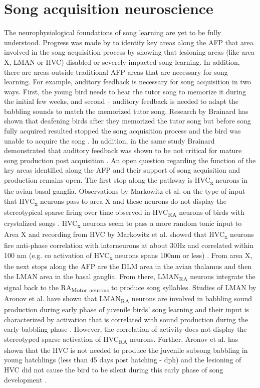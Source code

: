 \documentclass[draft,12pt,oneside]{CUNY_PhD}
\begin{document}
\section{Song acquisition neuroscience}
The neurophysiological foundations of song learning are yet to be fully understood. Progress was made by \cite{12} to identify key areas along the AFP that area involved in the song acquisition process by showing that lesioning areas (like area X, LMAN or HVC) disabled or severely impacted song learning. In addition, there are areas outside traditional AFP areas that are necessary for song learning. For example, auditory feedback is necessary for song acquisition in two ways. First, the young bird needs to hear the tutor song to memorize it during the initial few weeks, and second – auditory feedback is needed to adapt the babbling sounds to match the memorized tutor song. Research by Brainard has shown that deafening birds after they memorized the tutor song but before song fully acquired resulted stopped the song acquisition process and the bird was unable to acquire the song \cite{11}. In addition, in the same study Brainard demonstrated that auditory feedback was shown to be not critical for mature song production post acquisition \cite{11}.
An open question regarding the function of the key areas identified along the AFP and their support of song acquisition and production remains open. The first stop along the pathway is HVC\textsubscript{x} neurons in the avian basal ganglia. Observations by Markowitz et al. on the type of input that HVC\textsubscript{x} neurons pass to area X and these neurons do not display the stereotypical sparse firing over time observed in HVC\textsubscript{RA} neurons of birds with crystalized songs \cite{9}. HVC\textsubscript{x} neurons seem to pass a more random tonic input to Area X and recording from HVC by Markowitz et al. showed that HVC\textsubscript{x} neurons fire anti-phase correlation with interneurons at about 30Hz and correlated within 100 nm (e.g. co activation of HVC\textsubscript{x} neurons spans 100nm or less) \cite{9}. From area X, the next stops along the AFP are the DLM area in the avian thalamus and then the LMAN area in the basal ganglia. From there, LMAN\textsubscript{RA} neurons integrate the signal back to the RA\textsubscript{Motor neurons} to produce song syllables. Studies of LMAN by Aronov et al. have shown that LMAN\textsubscript{RA} neurons are involved in babbling sound production during early phase of juvenile birds’ song learning and their input is characterized by activation that is correlated with sound production during the early babbling phase \cite{6}. However, the correlation of activity does not display the stereotyped sparse activation of HVC\textsubscript{RA} neurons. Further, Aronov et al. has shown that the HVC is not needed to produce the juvenile subsong babbling in young hatchlings (less than 45 days post hatching - dph) and the lesioning of HVC did not cause the bird to be silent during this early phase of song development \cite{6}. 
\end{document}
